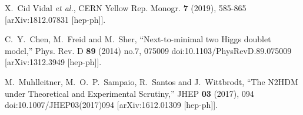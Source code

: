 \documentclass[12pt]{article}
\begin{document}


\newcommand\jnl[1]{\textit{\frenchspacing #1}}
\newcommand\vol[1]{\textbf{#1}}

\begin{thebibliography}{100}

%

X.~Cid Vidal \textit{et al.}, 
CERN Yellow Rep. Monogr. \textbf{7} (2019), 585-865
[arXiv:1812.07831 [hep-ph]].

C.~Y.~Chen, M.~Freid and M.~Sher,
``Next-to-minimal two Higgs doublet model,''
Phys. Rev. D \textbf{89} (2014) no.7, 075009
doi:10.1103/PhysRevD.89.075009
[arXiv:1312.3949 [hep-ph]].

M.~Muhlleitner, M.~O.~P.~Sampaio, R.~Santos and J.~Wittbrodt,
``The N2HDM under Theoretical and Experimental Scrutiny,''
JHEP \textbf{03} (2017), 094
doi:10.1007/JHEP03(2017)094
[arXiv:1612.01309 [hep-ph]].


\end{thebibliography}



\newpage{\pagestyle{empty}\cleardoublepage}

\end{document}
